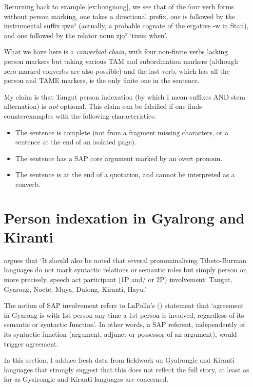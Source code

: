 \documentclass[oldfontcommands,oneside,a4paper,11pt]{article}
\newcommand{\ipa}[1]{{\phon \mbox{#1}}} %
\begin{document}
Returning back to example \ref{ex:hongnong}, we see that of the four verb forms without person marking, one takes a directional prefix, one is followed by the instrumental suffix  \ipa{ŋwu²} (actually, a probable cognate of the ergative \ipa{-w} in Stau), and one followed by the relator noun  \ipa{zjọ²} `time; when'. 

What we have here is a \textit{converbial chain}, with four non-finite verbs lacking person markers but taking various TAM and subordination markers (although zero marked converbs are also possible) and the last verb, which has all the person and TAME markers, is the only finite one in the sentence.

My claim is that Tangut person indexation (by which I mean suffixes AND stem alternation) is \textit{not} optional. This claim can be falsified if one finds counterexamples with the following characteristics:

\begin{itemize}
\item The sentence is complete (not from a fragment missing characters, or a sentence at the end of an isolated page).
\item The sentence has a SAP core argument marked by an overt pronoun.
\item The sentence is at the end of a quotation, and cannot be interpreted as a converb.
\end{itemize}

\section{Person indexation in Gyalrong and Kiranti} \label{sec:rgyalrong}
\citet[53]{zeisler15eat} argues  that `It should also be noted that several pronominalising Tibeto-Burman languages do not mark syntactic relations or semantic roles but simply person or, more precisely, speech act participant (1P and/ or 2P) involvement: Tangut, Gyarong, Nocte, Muya, Dulong, Kiranti, Hayu.' 

The notion of SAP involvement refers to LaPolla's (\citeyear[308]{lapolla92}) statement that `agreement in Gyarong is with 1st person any time a 1st person is involved, regardless of its semantic or syntactic function'. In other words, a SAP referent, independently of its syntactic function (argument, adjunct or possessor of an argument), would trigger agreement. 

In this section,  I adduce fresh data from fieldwork on Gyalrongic and Kiranti languages that strongly suggest that this does not reflect the full story, at least as far as Gyalrongic and Kiranti languages are concerned.
\end{document}
